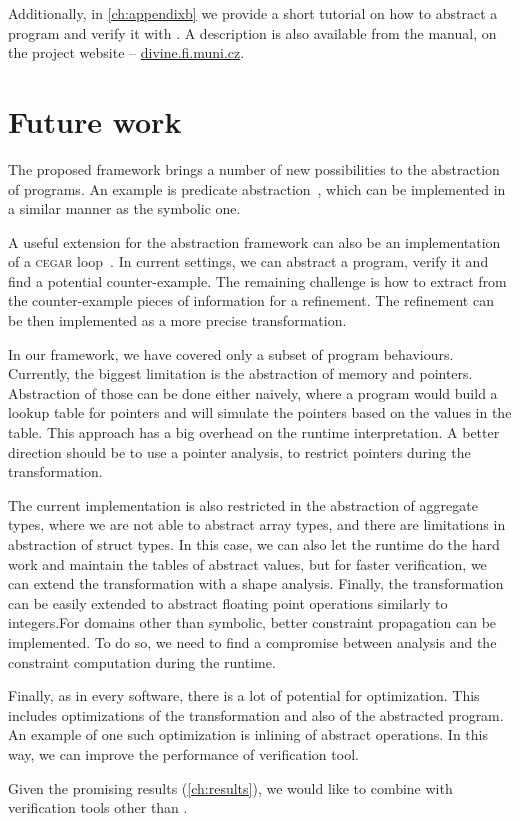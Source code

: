 Additionally, in \autoref{ch:appendixb} we provide a short tutorial on how to
abstract a program and verify it with \DIVINE. A description is also
available from the manual, on the project website -- \url{divine.fi.muni.cz}.

\section{Future work}

The proposed framework brings a number of new possibilities to the abstraction of
programs. An example is predicate abstraction~\cite{Flanagan02}, which can be
implemented in a similar manner as the symbolic one.

A useful extension for the abstraction framework can also be an implementation
of a \textsc{cegar} loop~\cite{Clarke20}. In current settings, we can
abstract a program, verify it and find a potential counter-example. The
remaining challenge is how to extract from the counter-example pieces of information for a refinement. The refinement can be then implemented as a more precise
transformation.

In our framework, we have covered only a subset of program behaviours.
Currently, the biggest limitation is the abstraction of memory and pointers.
Abstraction of those can be done either naively, where a program would build
a lookup table for pointers and will simulate the pointers based
on the values in the table. This approach has a big overhead on the runtime
interpretation. A better direction should be to use a pointer analysis, to
restrict pointers during the transformation.

The current implementation is also restricted in the abstraction of aggregate
types, where we are not able to abstract array types, and there are limitations
in abstraction of struct types. In this case, we can also let the runtime do the
hard work and maintain the tables of abstract values, but for faster
verification, we can extend the transformation with a shape analysis. Finally,
the transformation can be easily extended to abstract floating
point operations similarly to integers.For domains other than
symbolic, better constraint propagation can be implemented. To do
so, we need to find a compromise between analysis and the
constraint computation during the runtime.

Finally, as in every software, there is a lot of potential for optimization.
This includes optimizations of the transformation and also of the abstracted program.
An example of one such optimization is inlining of abstract operations. In this
way, we can improve the performance of verification tool.

Given the promising results (\autoref{ch:results}), we would like to combine
\LART with verification tools other than \DIVINE.
